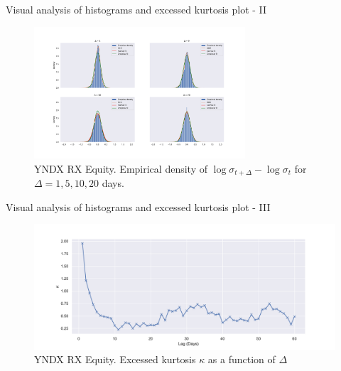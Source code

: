             \begin{frame}{Visual analysis of histograms and excessed kurtosis plot - II}
                \begin{figure}[htbp]
                    \includegraphics[width=0.7\textwidth]{fig/YNDX RX Equity 30 Lag Hists.pdf}
                    \caption{YNDX RX Equity. Empirical density of $\log \sigma_{t+\Delta} - \log \sigma_{t}$ for $\Delta = 1, 5, 10, 20$ days.}
                    \label{fig:lagHists}
                \end{figure}
            \end{frame}

            \begin{frame}{Visual analysis of histograms and excessed kurtosis plot - III}
                \begin{figure}[htbp]
                    \includegraphics[width=\textwidth]{fig/YNDX RX Equity Excessed Curtosis.pdf}
                    \caption{YNDX RX Equity. Excessed kurtosis $\kappa$ as a function of $\Delta$}
                    \label{fig:exkurt}
                \end{figure}
            \end{frame}

